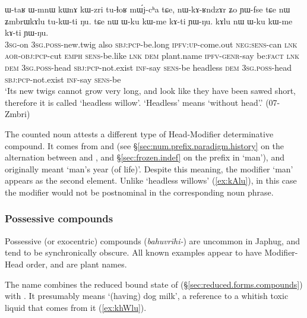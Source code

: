 \begin{exe}
\ex \label{ex:kAlu} 
\gll ɯ-taʁ ɯ-mnɯ kɯnɤ kɯ-zri tu-ɬoʁ mɯ́j-cʰa tɕe, nɯ-kɤ-ʁndzɤr ʑo ɲɯ-fse tɕe nɯ ʑmbrɯkɤlu tu-kɯ-ti ŋu. tɕe nɯ ɯ-ku kɯ-me kɤ-ti ɲɯ-ŋu. kɤlu nɯ ɯ-ku kɯ-me kɤ-ti ɲɯ-ŋu.\\
\textsc{3sg}-on \textsc{3sg}.\textsc{poss}-new.twig also \textsc{sbj}:\textsc{pcp}-be.long \textsc{ipfv}:\textsc{up}-come.out \textsc{neg}:\textsc{sens}-can \textsc{lnk} \textsc{aor}-\textsc{obj}:\textsc{pcp}-cut \textsc{emph} \textsc{sens}-be.like \textsc{lnk} \textsc{dem} plant.name \textsc{ipfv}-\textsc{genr}-say be:\textsc{fact} \textsc{lnk} \textsc{dem} \textsc{3sg}.\textsc{poss}-head \textsc{sbj}:\textsc{pcp}-not.exist \textsc{inf}-say \textsc{sens}-be headless \textsc{dem} \textsc{3sg}.\textsc{poss}-head \textsc{sbj}:\textsc{pcp}-not.exist \textsc{inf}-say \textsc{sens}-be\\
\glt `Its new twigs cannot grow very long, and look like they have been sawed short, therefore it is called `headless willow'. `Headless' means `without head'.' (07-Zmbri)
\end{exe}

The counted noun  attests a different type of Head-Modifier determinative compound. It comes from  and  (see §\ref{sec:num.prefix.paradigm.history} on the alternation between  and , and §\ref{sec:frozen.indef} on the  prefix in `man'), and originally meant `man's year (of life)'. Despite this meaning, the modifier `man' appears as the second element. Unlike `headless willows' (\ref{ex:kAlu}), in this case the modifier would not be postnominal in the corresponding noun phrase. 


\subsubsection{Possessive compounds} \label{sec:possessive.n.n}
Possessive (or exocentric) compounds (\textit{bahuvrīhi-}) are uncommon in Japhug, and tend to be synchronically obscure. All known examples appear to have Modifier-Head order, and are plant names.

The name \textit{} combines the reduced bound state of  (§\ref{sec:reduced.forms.compounds}) with . It presumably means `(having) dog milk', a reference to a whitish toxic liquid that comes from it (\ref{ex:khWlu}).

